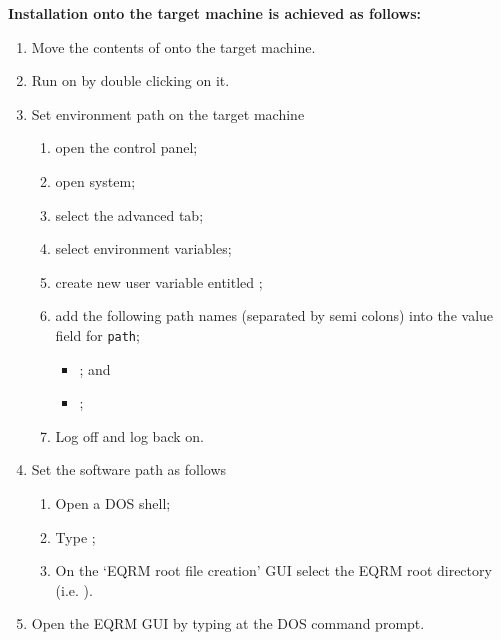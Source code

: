 \vspace{2em} \textbf{Installation onto the target machine is
achieved as follows:}
\begin{enumerate}
\item Move the contents of  onto
the target machine. \item Run  on
 by double clicking on it.
\item Set environment path on the target machine
\begin{enumerate}
\item open the control panel; \item open system; \item select the
advanced tab; \item select environment variables; \item create new
user variable entitled ; \item add the
following path names (separated by semi colons) into the value
field for \texttt{path};
\begin{itemize} \item
{}; and \item
{};
\end{itemize}
\item Log off and log back on.
\end{enumerate}
\item Set the software path as follows
\begin{enumerate}
\item Open a DOS shell; \item Type
; \item On the
`EQRM root file creation' GUI select the EQRM root directory (i.e.
).
\end{enumerate}
\item Open the EQRM GUI by typing
 at the DOS command
prompt.
\end{enumerate}

